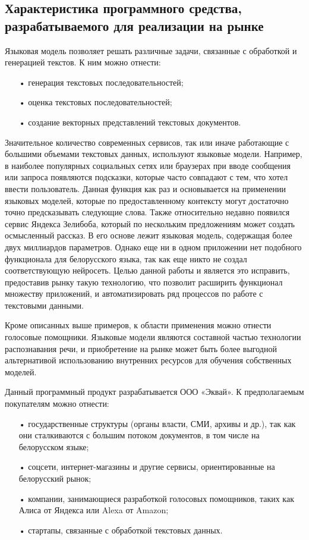 
\subsection{Характеристика программного средства, разрабатываемого для реализации на рынке}
Языковая модель позволяет решать различные задачи, связанные с обработкой и генерацией текстов. К ним можно отнести:
\begin{itemize}
	\item[•] генерация текстовых последовательностей;
	\item[•] оценка текстовых последовательностей;
	\item[•] создание векторных представлений текстовых документов.
\end{itemize}

Значительное количество современных сервисов, так или иначе работающие с большими объемами текстовых данных, используют языковые модели. Например, в наиболее популярных социальных сетях или браузерах при вводе сообщения или запроса появляются подсказки, которые часто совпадают с тем, что хотел ввести пользователь. Данная функция как раз и основывается на применении языковых моделей, которые по предоставленному контексту могут достаточно точно предсказывать следующие слова.
Также относительно недавно появился сервис Яндекса Зелибоба, который по нескольким предложениям может создать осмысленный рассказ. В его основе лежит языковая модель, содержащая более двух миллиардов параметров. Однако еще ни в одном приложении нет подобного функционала для белорусского языка, так как еще никто не создал соответствующую нейросеть. Целью данной работы и является это исправить, предоставив рынку такую технологию, что позволит расширить функционал множеству приложений, и автоматизировать ряд процессов по работе с текстовыми данными.

Кроме описанных выше примеров, к области применения можно отнести голосовые помощники. Языковые модели являются составной частью технологии распознавания речи, и приобретение на рынке может быть более выгодной альтернативой использованию внутренних ресурсов для обучения собственных моделей.

Данный программный продукт разрабатывается ООО «Эквай». К предполагаемым покупателям можно отнести:
\begin{itemize}
	\item[•] государственные структуры (органы власти, СМИ, архивы и др.), так как они сталкиваются с большим потоком документов, в том числе на белорусском языке;
	\item[•] соцсети, интернет-магазины и другие сервисы, ориентированные на белорусский рынок;
	\item[•] компании, занимающиеся разработкой голосовых помощников, таких как Алиса от Яндекса или Alexa от Amazon;
	\item[•] стартапы, связанные с обработкой текстовых данных.
\end{itemize}

